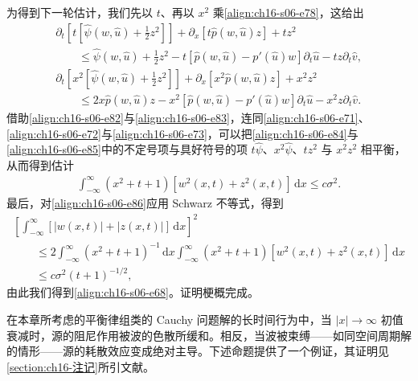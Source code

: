 \documentclass[../../main.tex]{subfiles}
\begin{document}
为得到下一轮估计，我们先以 $t$、再以 $x^2$ 乘\eqref{align:ch16-s06-e78}，这给出
\begin{align}
\partial_t\left[t\left[\hat\psi(w,\hat u)+\frac12z^2\right]\right]+\partial_x[t\hat p(w,\hat u)z]+tz^2\nonumber\\
\qquad\leqslant\hat\psi(w,\hat u)+\frac12z^2-t[\hat p(w,\hat u)-p'(\hat u)w]\partial_t\hat u-tz\partial_t\hat v,
\label{align:ch16-s06-e84}\\
\partial_t\left[x^2\left[\hat\psi(w,\hat u)+\frac12z^2\right]\right]+\partial_x[x^2\hat p(w,\hat u)z]+x^2z^2\nonumber\\
\qquad\leqslant2x\hat p(w,\hat u)z-x^2[\hat p(w,\hat u)-p'(\hat u)w]\partial_t\hat u-x^2z\partial_t\hat v.
\label{align:ch16-s06-e85}
\end{align}
借助\eqref{align:ch16-s06-e82}与\eqref{align:ch16-s06-e83}，连同\eqref{align:ch16-s06-e71}、\eqref{align:ch16-s06-e72}与\eqref{align:ch16-s06-e73}，可以把\eqref{align:ch16-s06-e84}与\eqref{align:ch16-s06-e85}中的不定号项与具好符号的项 $t\hat\psi$、$x^2\hat\psi$、$tz^2$ 与 $x^2z^2$ 相平衡，从而得到估计
\begin{align}
\int_{-\infty}^{\infty}(x^2+t+1)[w^2(x,t)+z^2(x,t)]\,\mathrm{d}x\leqslant c\sigma^2.
\label{align:ch16-s06-e86}
\end{align}
最后，对\eqref{align:ch16-s06-e86}应用 Schwarz 不等式，得到
\begin{align}
\left[\int_{-\infty}^{\infty}[|w(x,t)|+|z(x,t)|]\,\mathrm{d}x\right]^2\nonumber\\
\qquad\leqslant2\int_{-\infty}^{\infty}(x^2+t+1)^{-1}\,\mathrm{d}x\int_{-\infty}^{\infty}(x^2+t+1)[w^2(x,t)+z^2(x,t)]\,\mathrm{d}x\nonumber\\
\qquad\leqslant c\sigma^2(t+1)^{-1/2},
\label{align:ch16-s06-e87}
\end{align}
由此我们得到\eqref{align:ch16-s06-e68}。证明梗概完成。

在本章所考虑的平衡律组类的 Cauchy 问题解的长时间行为中，当 $|x|\to\infty$ 初值衰减时，源的阻尼作用被波的色散所缓和。相反，当波被束缚——如同空间周期解的情形——源的耗散效应变成绝对主导。下述命题提供了一个例证，其证明见\cref{section:ch16-注记}所引文献。
\end{document}
